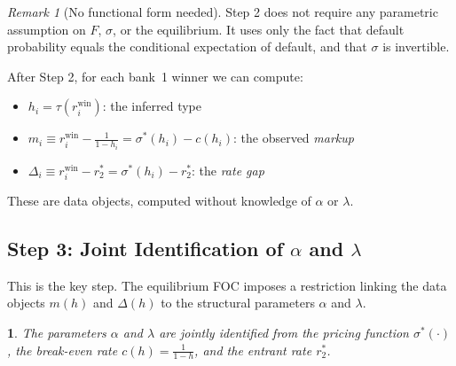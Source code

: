 \documentclass[12pt]{article}
\theoremstyle{plain}
\theoremstyle{plain}
\newtheorem{prop}[thm]{\protect\propositionname}
\theoremstyle{definition}  %
\theoremstyle{remark}  %
\newtheorem{remark}[thm]{Remark}  %
\providecommand{\propositionname}{Proposition}
\begin{document}
\begin{remark}[No functional form needed]
Step 2 does not require any parametric assumption on $F$, $\sigma$, or the equilibrium. It uses only the fact that default probability equals the conditional expectation of default, and that $\sigma$ is invertible.
\end{remark}

After Step 2, for each bank~1 winner we can compute:
\begin{itemize}
    \item $h_i = \tau(r_i^{\text{win}})$: the inferred type
    \item $m_i \equiv r_i^{\text{win}} - \frac{1}{1-h_i} = \sigma^*(h_i) - c(h_i)$: the observed \emph{markup}
    \item $\Delta_i \equiv r_i^{\text{win}} - r_2^* = \sigma^*(h_i) - r_2^*$: the \emph{rate gap}
\end{itemize}
These are data objects, computed without knowledge of $\alpha$ or $\lambda$.


\subsection{Step 3: Joint Identification of $\alpha$ and $\lambda$}

This is the key step. The equilibrium FOC imposes a restriction linking the data objects $m(h)$ and $\Delta(h)$ to the structural parameters $\alpha$ and $\lambda$.

\begin{prop}\label{prop:alpha_lambda}
The parameters $\alpha$ and $\lambda$ are jointly identified from the pricing function $\sigma^*(\cdot)$, the break-even rate $c(h) = \frac{1}{1-h}$, and the entrant rate $r_2^*$.
\end{prop}
\end{document}
